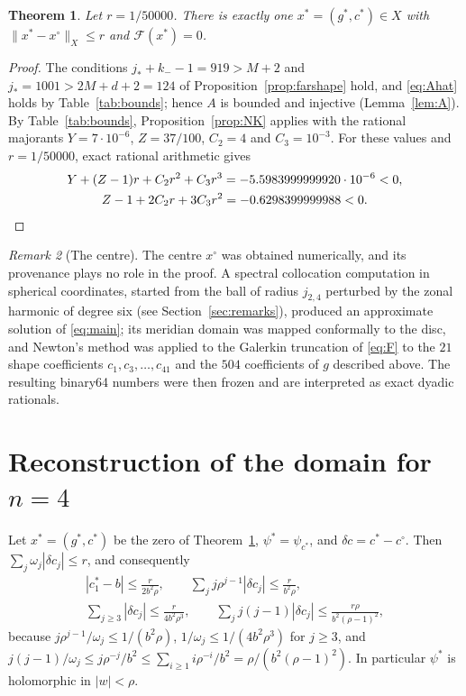 \documentclass[11pt]{amsart}
\newtheorem{theorem}{Theorem}[section]
\theoremstyle{definition}
\theoremstyle{remark}
\newtheorem{remark}[theorem]{Remark}
\numberwithin{equation}{section}
\newcommand{\Fc}{\mathcal{F}}
\newcommand{\jst}{j_*}
\newcommand{\nrm}[1]{\lVert #1\rVert}
\begin{document}
\begin{theorem}\label{thm:zero}
Let $r=1/50000$. There is exactly one $x^*=(g^*,c^*)\in X$ with $\nrm{x^*-x^\circ}_X\leq r$ and $\Fc(x^*)=0$.
\end{theorem}

\begin{proof}
The conditions $\jst+k_--1=919>M+2$ and $\jst=1001>2M+d+2=124$ of Proposition~\ref{prop:farshape} hold, and \eqref{eq:Ahat} holds by Table~\ref{tab:bounds}; hence $A$ is bounded and injective (Lemma~\ref{lem:A}). By Table~\ref{tab:bounds}, Proposition~\ref{prop:NK} applies with the rational majorants $Y=7\cdot10^{-6}$, $Z=37/100$, $C_2=4$ and $C_3=10^{-3}$. For these values and $r=1/50000$, exact rational arithmetic gives
\begin{gather*}
Y+(Z-1)r+C_2r^2+C_3r^3=-5.5983999999920\cdot10^{-6}<0,\\
Z-1+2C_2r+3C_3r^2=-0.6298399999988<0 . \qedhere
\end{gather*}
\end{proof}

\begin{remark}[The centre]\label{rem:centre}
The centre $x^\circ$ was obtained numerically, and its provenance plays no role in the proof. A spectral collocation computation in spherical coordinates, started from the ball of radius $j_{2,4}$ perturbed by the zonal harmonic of degree six (see Section~\ref{sec:remarks}), produced an approximate solution of \eqref{eq:main}; its meridian domain was mapped conformally to the disc, and Newton's method was applied to the Galerkin truncation of \eqref{eq:F} to the $21$ shape coefficients $c_1,c_3,\ldots,c_{41}$ and the $504$ coefficients of $g$ described above. The resulting binary64 numbers were then frozen and are interpreted as exact dyadic rationals.
\end{remark}

\section{\texorpdfstring{Reconstruction of the domain for $n=4$}{Reconstruction of the domain for n=4}}\label{sec:recon}

Let $x^*=(g^*,c^*)$ be the zero of Theorem~\ref{thm:zero}, $\psi^*=\psi_{c^*}$, and $\delta c=c^*-c^\circ$. Then $\sum_j\omega_j|\delta c_j|\leq r$, and consequently
\begin{equation}\label{eq:dc}
\begin{gathered}
|c_1^*-b|\leq\frac{r}{2b^2\rho},\qquad \sum_{j}j\rho^{j-1}|\delta c_j|\leq\frac r{b^2\rho},\\
\sum_{j\geq3}|\delta c_j|\leq\frac r{4b^2\rho^3},\qquad\sum_jj(j-1)|\delta c_j|\leq\frac{r\rho}{b^2(\rho-1)^2},
\end{gathered}
\end{equation}
because $j\rho^{j-1}/\omega_j\leq1/(b^2\rho)$, $1/\omega_j\leq1/(4b^2\rho^3)$ for $j\geq3$, and $j(j-1)/\omega_j\leq j\rho^{-j}/b^2\leq\sum_{i\geq1}i\rho^{-i}/b^2=\rho/(b^2(\rho-1)^2)$. In particular $\psi^*$ is holomorphic in $|w|<\rho$.
\end{document}

